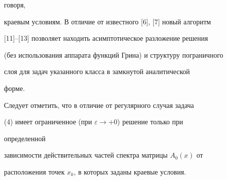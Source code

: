 говоря, 


краевым условиям. В отличие от известного [6], [7] новый алгоритм 


[11]--[13] позволяет находить асимптотическое разложение решения 


(без использования аппарата функций Грина) и структуру пограничного 


слоя для задач указанного класса в замкнутой аналитической 


форме. 


 


Следует отметить, что в отличие от регулярного случая задача 


(4) имеет ограниченное (при $\varepsilon\to+0$) решение только при 


определенной 


зависимости действительных частей спектра матрицы $A_0(x)$ от 


расположения точек $x_k$, в которых заданы краевые условия.


 


